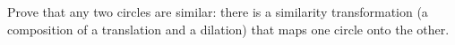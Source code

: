 Prove that any two circles are similar: there is a similarity transformation (a composition of a translation and a dilation) that maps one circle onto the other.
